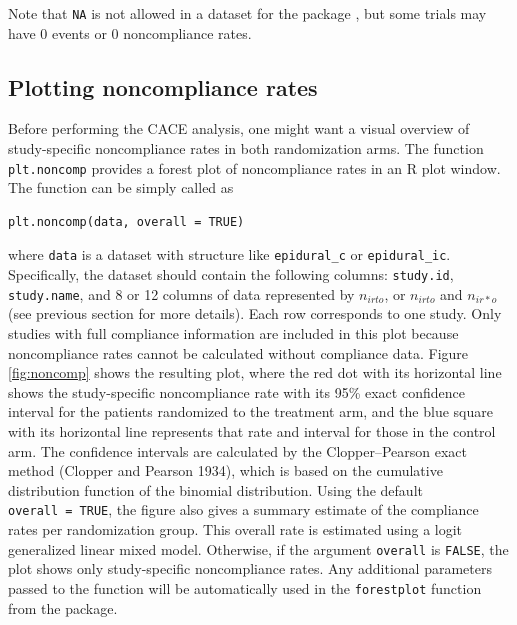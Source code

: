 \noindent Note that \texttt{NA} is not allowed in a dataset for the package , but some trials may have 0 events or 0 noncompliance rates.

\hypertarget{plotting-noncompliance-rates}{%
\subsection{Plotting noncompliance rates}\label{plotting-noncompliance-rates}}

Before performing the CACE analysis, one might want a visual overview of study-specific noncompliance rates in both randomization arms. The function \texttt{plt.noncomp} provides a forest plot of noncompliance rates in an R plot window. The function can be simply called as

\begin{verbatim}
plt.noncomp(data, overall = TRUE)
\end{verbatim}

where \texttt{data} is a dataset with structure like \texttt{epidural\_c} or \texttt{epidural\_ic}. Specifically, the dataset should contain the following columns: \texttt{study.id}, \texttt{study.name}, and 8 or 12 columns of data represented by \(n_{irto}\), or \(n_{irto}\) and \(n_{ir*o}\) (see previous section for more details). Each row corresponds to one study. Only studies with full compliance information are included in this plot because noncompliance rates cannot be calculated without compliance data.
Figure \ref{fig:noncomp} shows the resulting plot, where the red dot with its horizontal line shows the study-specific noncompliance rate with its 95\% exact confidence interval for the patients randomized to the treatment arm, and the blue square with its horizontal line represents that rate and interval for those in the control arm.
The confidence intervals are calculated by the Clopper--Pearson exact method (Clopper and Pearson 1934), which is based on the cumulative distribution function of the binomial distribution. Using the default \texttt{overall\ =\ TRUE}, the figure also gives a summary estimate of the compliance rates per randomization group. This overall rate is estimated using a logit generalized linear mixed model. Otherwise, if the argument \texttt{overall} is \texttt{FALSE}, the plot shows only study-specific noncompliance rates. Any additional parameters passed to the function will be automatically used in the \texttt{forestplot} function from the  package.


